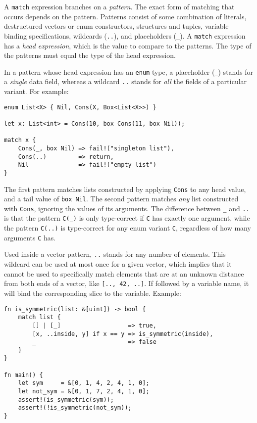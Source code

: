 \documentclass[]{article}
\begin{document}
A \texttt{match} expression branches on a \emph{pattern}. The exact form
of matching that occurs depends on the pattern. Patterns consist of some
combination of literals, destructured vectors or enum constructors,
structures and tuples, variable binding specifications, wildcards
(\texttt{..}), and placeholders (\texttt{\_}). A \texttt{match}
expression has a \emph{head expression}, which is the value to compare
to the patterns. The type of the patterns must equal the type of the
head expression.

In a pattern whose head expression has an \texttt{enum} type, a
placeholder (\texttt{\_}) stands for a \emph{single} data field, whereas
a wildcard \texttt{..} stands for \emph{all} the fields of a particular
variant. For example:

\begin{verbatim}
enum List<X> { Nil, Cons(X, Box<List<X>>) }

let x: List<int> = Cons(10, box Cons(11, box Nil));

match x {
    Cons(_, box Nil) => fail!("singleton list"),
    Cons(..)         => return,
    Nil              => fail!("empty list")
}
\end{verbatim}

The first pattern matches lists constructed by applying \texttt{Cons} to
any head value, and a tail value of \texttt{box Nil}. The second pattern
matches \emph{any} list constructed with \texttt{Cons}, ignoring the
values of its arguments. The difference between \texttt{\_} and
\texttt{..} is that the pattern \texttt{C(\_)} is only type-correct if
\texttt{C} has exactly one argument, while the pattern \texttt{C(..)} is
type-correct for any enum variant \texttt{C}, regardless of how many
arguments \texttt{C} has.

Used inside a vector pattern, \texttt{..} stands for any number of
elements. This wildcard can be used at most once for a given vector,
which implies that it cannot be used to specifically match elements that
are at an unknown distance from both ends of a vector, like
\texttt{{[}.., 42, ..{]}}. If followed by a variable name, it will bind
the corresponding slice to the variable. Example:

\begin{verbatim}
fn is_symmetric(list: &[uint]) -> bool {
    match list {
        [] | [_]                   => true,
        [x, ..inside, y] if x == y => is_symmetric(inside),
        _                          => false
    }
}

fn main() {
    let sym     = &[0, 1, 4, 2, 4, 1, 0];
    let not_sym = &[0, 1, 7, 2, 4, 1, 0];
    assert!(is_symmetric(sym));
    assert!(!is_symmetric(not_sym));
}
\end{verbatim}
\end{document}
